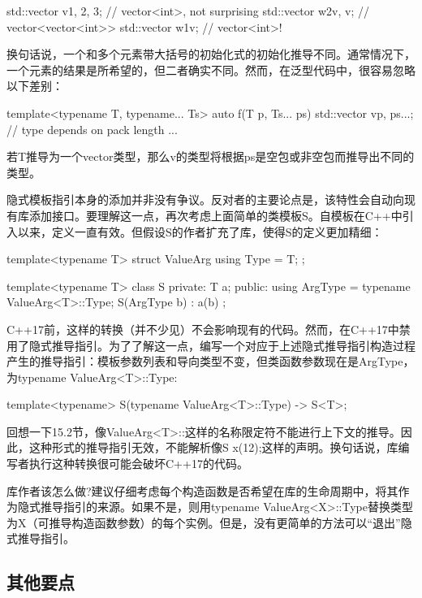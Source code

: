 \begin{cpp}
std::vector v{1, 2, 3}; // vector<int>, not surprising
std::vector w2{v, v}; // vector<vector<int>>
std::vector w1{v}; // vector<int>!
\end{cpp}

换句话说，一个和多个元素带大括号的初始化式的初始化推导不同。通常情况下，一个元素的结果是所希望的，但二者确实不同。然而，在泛型代码中，很容易忽略以下差别：

\begin{cpp}
template<typename T, typename... Ts>
auto f(T p, Ts... ps) {
	std::vector v{p, ps...}; // type depends on pack length
	...
}
\end{cpp}

若T推导为一个vector类型，那么v的类型将根据ps是空包或非空包而推导出不同的类型。

隐式模板指引本身的添加并非没有争议。反对者的主要论点是，该特性会自动向现有库添加接口。要理解这一点，再次考虑上面简单的类模板S。自模板在C++中引入以来，定义一直有效。但假设S的作者扩充了库，使得S的定义更加精细：

\begin{cpp}
template<typename T>
struct ValueArg {
	using Type = T;
};

template<typename T>
class S {
	private:
	T a;
	public:
	using ArgType = typename ValueArg<T>::Type;
	S(ArgType b) : a(b) {
	}
};
\end{cpp}

C++17前，这样的转换（并不少见）不会影响现有的代码。然而，在C++17中禁用了隐式推导指引。为了了解这一点，编写一个对应于上述隐式推导指引构造过程产生的推导指引：模板参数列表和导向类型不变，但类函数参数现在是ArgType，为typename ValueArg<T>::Type:

\begin{cpp}
template<typename> S(typename ValueArg<T>::Type) -> S<T>;
\end{cpp}

回想一下15.2节，像ValueArg<T>::这样的名称限定符不能进行上下文的推导。因此，这种形式的推导指引无效，不能解析像S x(12);这样的声明。换句话说，库编写者执行这种转换很可能会破坏C++17的代码。

库作者该怎么做?建议仔细考虑每个构造函数是否希望在库的生命周期中，将其作为隐式推导指引的来源。如果不是，则用typename ValueArg<X>::Type替换类型为X（可推导构造函数参数）的每个实例。但是，没有更简单的方法可以“退出”隐式推导指引。

\subsection{其他要点}

